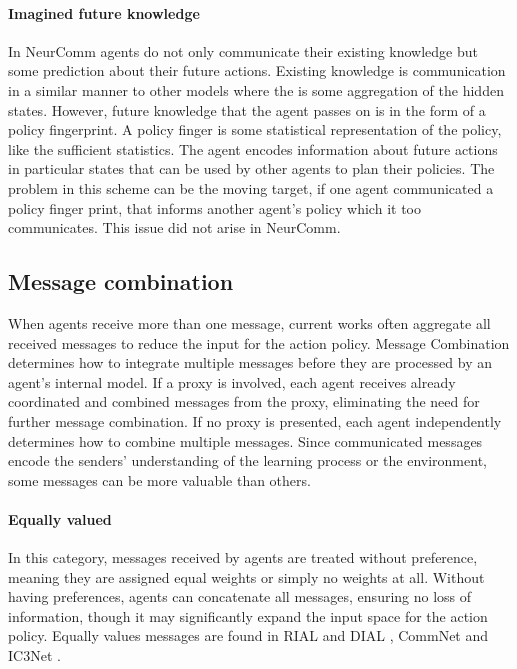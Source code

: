 \documentclass{article}
\begin{document}
\paragraph{Imagined future knowledge} In NeurComm \citep{chu2020NeurComm} agents do not only communicate their existing knowledge but some prediction about their future actions. Existing knowledge is communication in a similar manner to other models where the is some aggregation of the hidden states. However, future knowledge that the agent passes on is in the form of a policy fingerprint. A policy finger is some statistical representation of the policy, like the sufficient statistics. The agent encodes information about future actions in particular states that can be used by other agents to plan their policies. The problem in this scheme can be the moving target, if one agent communicated a policy finger print, that informs another agent's policy which it too communicates. This issue did not arise in NeurComm. \citep{chu2020NeurComm}


\subsection{Message combination}

When agents receive more than one message, current works often aggregate all received messages to reduce the input for the action policy. Message Combination determines how to integrate multiple messages before they are processed by an agent’s internal model. If a proxy is involved, each agent receives already coordinated and combined messages from the proxy, eliminating the need for further message combination. If no proxy is presented, each agent independently determines how to combine multiple messages. Since communicated messages encode the senders’ understanding of the learning process or the environment, some messages can be more valuable than others. 

\paragraph{Equally valued} In this category, messages received by agents are treated without preference, meaning they are assigned equal weights or simply no weights at all. Without having preferences, agents can concatenate all messages, ensuring no loss of information, though it may significantly expand the input space for the action policy. Equally values messages are found in RIAL and DIAL \citep{foerster2016learning}, CommNet \citep{sukhbaatar2016commnet} and IC3Net \citep{singh2018ic3net}. 
\end{document}
